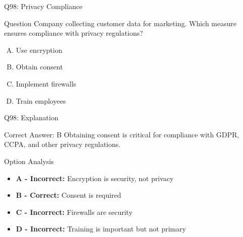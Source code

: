 \documentclass{beamer}
\begin{document}
	\begin{frame}{Q98: Privacy Compliance}
		\begin{block}{Question}
			Company collecting customer data for marketing. Which measure ensures compliance with privacy regulations?
		\end{block}
		\begin{enumerate}[(A)]
			\item Use encryption
			\item Obtain consent
			\item Implement firewalls
			\item Train employees
		\end{enumerate}
	\end{frame}
	
	\begin{frame}{Q98: Explanation}
		\begin{block}{Correct Answer: B}
			Obtaining consent is critical for compliance with GDPR, CCPA, and other privacy regulations.
		\end{block}
		\begin{block}{Option Analysis}
			\begin{itemize}
				\item \textbf{A - Incorrect:} Encryption is security, not privacy
				\item \textbf{B - Correct:} Consent is required
				\item \textbf{C - Incorrect:} Firewalls are security
				\item \textbf{D - Incorrect:} Training is important but not primary
			\end{itemize}
		\end{block}
	\end{frame}
	
\end{document}
